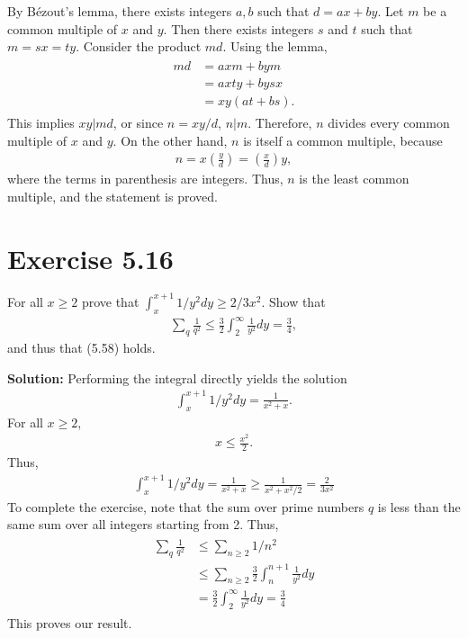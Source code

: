 \documentclass{book}
\begin{document}
    By Bézout's lemma, there exists integers $a,b$ such that $d = ax + by$. Let $m$ be a common multiple of $x$ and $y$. Then there exists integers $s$ and $t$ such that $m=sx=ty$. Consider the product $md$. Using the lemma,
    \begin{align}
    \begin{aligned}
        md &= axm+bym \\
        &= axty + bysx \\
        &= xy(at+bs).
    \end{aligned}
    \end{align}
    This implies $xy|md$, or since $n = xy/d$, $n|m$. Therefore, $n$ divides every common multiple of $x$ and $y$. On the other hand, $n$ is itself a common multiple, because 
    \begin{align}
        n = x \left(\frac{y}{d}\right) = \left(\frac{x}{d}\right)y,
    \end{align}
    where the terms in parenthesis are integers. Thus, $n$ is the least common multiple, and the statement is proved.
    
\section*{Exercise 5.16}
    For all $x\geq 2$ prove that $\int_x^{x+1} 1/y^2 dy \geq 2/3x^2$. Show that
    \begin{align}
        \sum_q \frac{1}{q^2} \leq \frac{3}{2}\int_2^\infty \frac{1}{y^2} dy =\frac{3}{4},
    \end{align}
    and thus that (5.58) holds.
    
    \textbf{Solution:} Performing the integral directly yields the solution
    \begin{align}
        \int_x^{x+1}1/y^2 dy = \frac{1}{x^2+x}.
    \end{align}
    For all $x\geq 2$,
    \begin{align}
        x \leq \frac{x^2}{2}.
    \end{align}
    Thus,
    \begin{align}
        \int_x^{x+1} 1/y^2 dy = \frac{1}{x^2+x} \geq \frac{1}{x^2 + x^2/2} = \frac{2}{3x^2}
    \end{align}
    To complete the exercise, note that the sum over prime numbers $q$ is less than the same sum over all integers starting from 2. Thus,
    \begin{align}
    \begin{aligned}
        \sum_q \frac{1}{q^2} &\leq \sum_{n\geq 2} 1/n^2 \\
        &\leq \sum_{n\geq 2} \frac{3}{2}\int_{n}^{n+1} \frac{1}{y^2} dy \\
        &= \frac{3}{2} \int_2^{\infty}\frac{1}{y^2} dy = \frac{3}{4}
    \end{aligned}
    \end{align}
    This proves our result.
    
\end{document}
